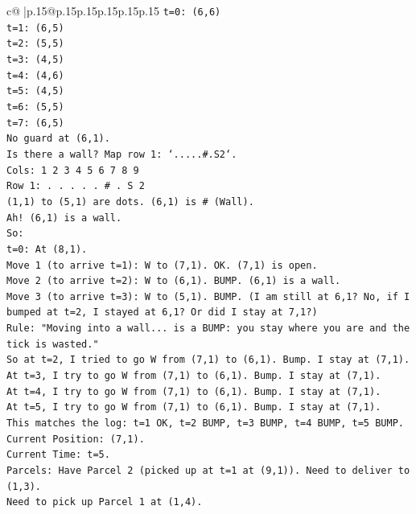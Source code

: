 \documentclass{article}
\begin{document}
{\begin{supertabular}{c@{$\;$}|p{.15\linewidth}@{}p{.15\linewidth}p{.15\linewidth}p{.15\linewidth}p{.15\linewidth}p{.15\linewidth}}
{{{\texttt{t=0: (6,6)} \\
\texttt{t=1: (6,5)} \\
\texttt{t=2: (5,5)} \\
\texttt{t=3: (4,5)} \\
\texttt{t=4: (4,6)} \\
\texttt{t=5: (4,5)} \\
\texttt{t=6: (5,5)} \\
\texttt{t=7: (6,5)} \\
\texttt{No guard at (6,1).} \\
\texttt{Is there a wall? Map row 1: `.....\#.S2`.} \\
\texttt{Cols: 1 2 3 4 5 6 7 8 9} \\
\texttt{Row 1: . . . . . \# . S 2} \\
\texttt{(1,1) to (5,1) are dots. (6,1) is \# (Wall).} \\
\texttt{Ah! (6,1) is a wall.} \\
\texttt{So:} \\
\texttt{t=0: At (8,1).} \\
\texttt{Move 1 (to arrive t=1): W to (7,1). OK. (7,1) is open.} \\
\texttt{Move 2 (to arrive t=2): W to (6,1). BUMP. (6,1) is a wall.} \\
\texttt{Move 3 (to arrive t=3): W to (5,1). BUMP. (I am still at 6,1? No, if I bumped at t=2, I stayed at 6,1? Or did I stay at 7,1?)} \\
\texttt{Rule: "Moving into a wall... is a BUMP: you stay where you are and the tick is wasted."} \\
\texttt{So at t=2, I tried to go W from (7,1) to (6,1). Bump. I stay at (7,1).} \\
\texttt{At t=3, I try to go W from (7,1) to (6,1). Bump. I stay at (7,1).} \\
\texttt{At t=4, I try to go W from (7,1) to (6,1). Bump. I stay at (7,1).} \\
\texttt{At t=5, I try to go W from (7,1) to (6,1). Bump. I stay at (7,1).} \\
\texttt{This matches the log: t=1 OK, t=2 BUMP, t=3 BUMP, t=4 BUMP, t=5 BUMP.} \\
\texttt{Current Position: (7,1).} \\
\texttt{Current Time: t=5.} \\
\texttt{Parcels: Have Parcel 2 (picked up at t=1 at (9,1)). Need to deliver to (1,3).} \\
\texttt{Need to pick up Parcel 1 at (1,4).} \\
}}}
\end{supertabular}}
\end{document}
